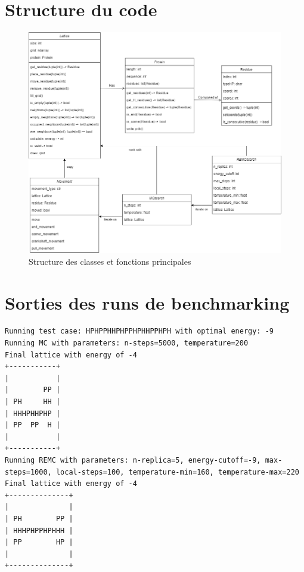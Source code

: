 \pagestyle{empty}

\begin{appendices}
    \appendixheaderon
    \singlespacing

    \section{Structure du code}
    \begin{figure}[H]
        \centering
        \includegraphics[width=\textwidth]{figures/class_dependencies.png}
        \caption{Structure des classes et fonctions principales}
        \label{fig:class_dependencies}
    \end{figure}

    \section{Sorties des runs de benchmarking}
    \begin{verbatim}
Running test case: HPHPPHHPHPPHPHHPPHPH with optimal energy: -9
Running MC with parameters: n-steps=5000, temperature=200
Final lattice with energy of -4
+-----------+
|           |
|        PP |
| PH     HH |
| HHHPHHPHP |
| PP  PP  H |
|           |
+-----------+
Running REMC with parameters: n-replica=5, energy-cutoff=-9, max-steps=1000, local-steps=100, temperature-min=160, temperature-max=220
Final lattice with energy of -4
+--------------+
|              |
| PH        PP |
| HHHPHPPHPHHH |
| PP        HP |
|              |
+--------------+
\end{verbatim}


\end{appendices}
